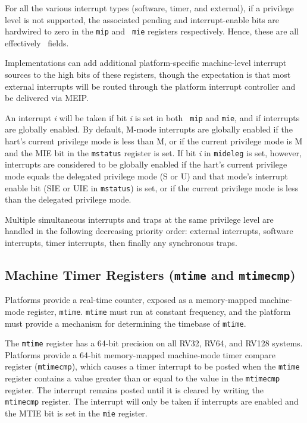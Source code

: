 For all the various interrupt types (software, timer, and external),
if a privilege level is not supported, the associated pending and
interrupt-enable bits are hardwired to zero in the {\tt mip} and {\tt
  mie} registers respectively.  Hence, these are all effectively
\warl\ fields.

\begin{commentary}
Implementations can add additional platform-specific machine-level
interrupt sources to the high bits of these registers, though the
expectation is that most external interrupts will be routed through
the platform interrupt controller and be delivered via MEIP.
\end{commentary}

An interrupt {\em i} will be taken if bit {\em i} is set in both {\tt
  mip} and {\tt mie}, and if interrupts are globally enabled.  By
default, M-mode interrupts are globally enabled if the hart's current
privilege mode is less than M, or if the current privilege mode is M
and the MIE bit in the {\tt mstatus} register is set.  If bit {\em i}
in {\tt mideleg} is set, however, interrupts are considered to be
globally enabled if the hart's current privilege mode equals the
delegated privilege mode (S or U) and that mode's interrupt enable
bit (SIE or UIE in {\tt mstatus}) is set, or if the current
privilege mode is less than the delegated privilege mode.

Multiple simultaneous interrupts and traps at the same privilege level
are handled in the following decreasing priority order: external
interrupts, software interrupts, timer interrupts, then finally any
synchronous traps.

\subsection{Machine Timer Registers ({\tt mtime} and {\tt mtimecmp})}

Platforms provide a real-time counter, exposed as a memory-mapped
machine-mode register, {\tt mtime}.  {\tt mtime} must run at constant
frequency, and the platform must provide a mechanism for determining
the timebase of {\tt mtime}.

The {\tt mtime} register has a 64-bit precision on all RV32, RV64, and
RV128 systems.  Platforms provide a 64-bit memory-mapped machine-mode
timer compare register ({\tt mtimecmp}), which causes a timer
interrupt to be posted when the {\tt mtime} register contains a value
greater than or equal to the value in the {\tt mtimecmp} register.
The interrupt remains posted until it is cleared by writing the {\tt
  mtimecmp} register.  The interrupt will only be taken if interrupts
are enabled and the MTIE bit is set in the {\tt mie} register.

